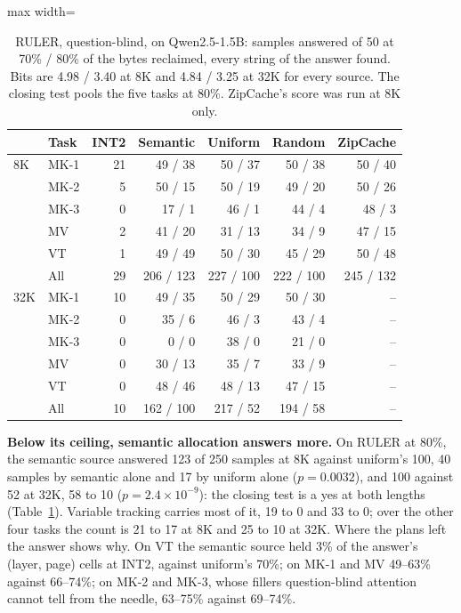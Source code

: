 \documentclass{article}
\begin{document}
\begin{table}[t]
\caption{RULER, question-blind, on Qwen2.5-1.5B: samples answered of 50 at
70\% / 80\% of the bytes reclaimed, every string of the answer found. Bits are
4.98 / 3.40 at 8K and 4.84 / 3.25 at 32K for every source. The closing test
pools the five tasks at 80\%. ZipCache's score was run at 8K only.}
\label{tab:ruler}
\centering
\small
\begin{adjustbox}{max width=\columnwidth}
\begin{tabular}{llrrrrr}
\toprule
 & Task & INT2 & Semantic & Uniform & Random & ZipCache \\
\midrule
8K & MK-1 & 21 & 49 / 38 & 50 / 37 & 50 / 38 & 50 / 40 \\
 & MK-2 & 5 & 50 / 15 & 50 / 19 & 49 / 20 & 50 / 26 \\
 & MK-3 & 0 & 17 / 1 & 46 / 1 & 44 / 4 & 48 / 3 \\
 & MV & 2 & 41 / 20 & 31 / 13 & 34 / 9 & 47 / 15 \\
 & VT & 1 & 49 / 49 & 50 / 30 & 45 / 29 & 50 / 48 \\
 & All & 29 & 206 / 123 & 227 / 100 & 222 / 100 & 245 / 132 \\
\midrule
32K & MK-1 & 10 & 49 / 35 & 50 / 29 & 50 / 30 & -- \\
 & MK-2 & 0 & 35 / 6 & 46 / 3 & 43 / 4 & -- \\
 & MK-3 & 0 & 0 / 0 & 38 / 0 & 21 / 0 & -- \\
 & MV & 0 & 30 / 13 & 35 / 7 & 33 / 9 & -- \\
 & VT & 0 & 48 / 46 & 48 / 13 & 47 / 15 & -- \\
 & All & 10 & 162 / 100 & 217 / 52 & 194 / 58 & -- \\
\bottomrule
\end{tabular}
\end{adjustbox}
\end{table}

\textbf{Below its ceiling, semantic allocation answers more.} On RULER at
80\%, the semantic source answered 123 of 250 samples at 8K against uniform's
100, 40 samples by semantic alone and 17 by uniform alone ($p = 0.0032$), and
100 against 52 at 32K, 58 to 10 ($p = 2.4 \times 10^{-9}$): the closing test is
a yes at both lengths (Table~\ref{tab:ruler}). Variable tracking carries most
of it, 19 to 0 and 33 to 0; over the other four tasks the count is 21 to 17 at
8K and 25 to 10 at 32K. Where the plans left the answer shows why. On VT the
semantic source held 3\% of the answer's (layer, page) cells at INT2, against
uniform's 70\%; on MK-1 and MV 49--63\% against 66--74\%; on MK-2 and MK-3,
whose fillers question-blind attention cannot tell from the needle, 63--75\%
against 69--74\%.
\end{document}
